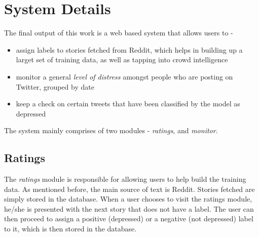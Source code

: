 \section{System Details}
The final output of this work is a web based system that allows users to -
\begin{itemize}
    \item{assign labels to stories fetched from Reddit, which helps in building up a larget set of training data, as well as tapping into crowd intelligence}
    \item{monitor a general \emph{level of distress} amongst people who are posting on Twitter, grouped by date}
    \item{keep a check on certain tweets that have been classified by the model as depressed}
\end{itemize}

The system mainly comprises of two modules - \emph{ratings}, and \emph{monitor}.

\subsection{Ratings}
The \emph{ratings} module is responsible for allowing users to help build the training data. As mentioned before, the main source of text is Reddit. Stories fetched are simply stored in the database. When a user chooses to visit the ratings module, he/she is presented with the next story that does not have a label. The user can then proceed to assign a positive (depressed) or a negative (not depressed) label to it, which is then stored in the database.
